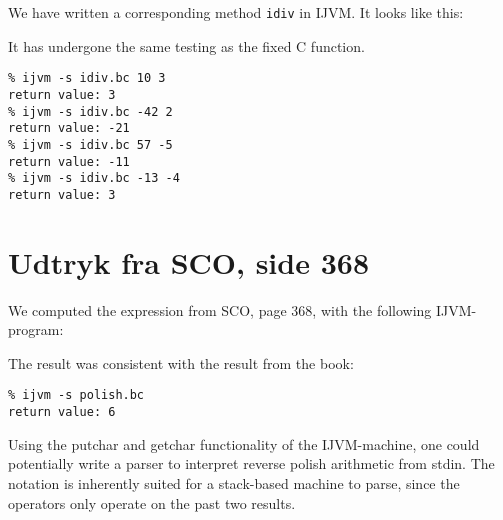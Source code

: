\documentclass[12pt,a4paper]{article}
\begin{document}
We have written a corresponding method \texttt{idiv} in IJVM. It looks like
this:

\lstset{language=JVMIS}


It has undergone the same testing as the fixed C function.

\lstset{language=sh,numbers=none}
\begin{lstlisting}
% ijvm -s idiv.bc 10 3
return value: 3
% ijvm -s idiv.bc -42 2
return value: -21
% ijvm -s idiv.bc 57 -5
return value: -11
% ijvm -s idiv.bc -13 -4
return value: 3
\end{lstlisting}

\section{Udtryk fra SCO, side 368}
We computed the expression from SCO, page 368, with the following IJVM-program:
\lstset{language=JVMIS}


The result was consistent with the result from the book:
\lstset{language=sh,numbers=none}
\begin{lstlisting}
% ijvm -s polish.bc
return value: 6
\end{lstlisting}

Using the putchar and getchar functionality of the IJVM-machine, one could potentially write a parser to interpret reverse polish arithmetic from stdin.
The notation is inherently suited for a stack-based machine to parse, since the operators only operate on the past two results.
\end{document}
